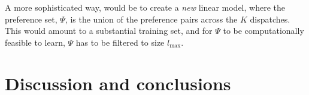 A more sophisticated way, would be to create a \emph{new} linear model, where 
the preference set, $\Psi$, is the union of the preference pairs across the $K$ 
dispatches. This would amount to a substantial training set, and for $\Psi$ to 
be computationally feasible to learn, $\Psi$ has to be filtered to size 
$l_{\max}$.


\section{Discussion and conclusions}